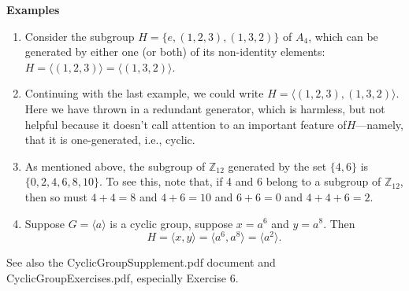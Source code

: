\documentclass[12pt]{article}
\newcommand{\Z} {{\mathbb Z}}
\newcommand{\<}{\ensuremath{\langle}}
\renewcommand{\>}{\ensuremath{\rangle}}
\theoremstyle{plain}
\theoremstyle{definition}
\begin{document}
{\bf Examples}
\begin{enumerate}
\item 
Consider the subgroup $H = \{e, (1,2,3), (1,3,2)\}$ of $A_4$,
which can be generated by either one (or both)
of its non-identity elements:
$H = \<(1,2,3)\> = \<(1,3,2)\>$.

\item
Continuing with the last example, we could write $H = \<(1,2,3), (1,3,2)\>$.
Here we have thrown in a redundant generator, which is harmless, but not helpful
because it doesn't call attention to an important feature of$H$---namely, that it is
one-generated, i.e., cyclic.

\item As mentioned above, the subgroup of $\Z_{12}$ generated by the set $\{4, 6\}$ is 
$\{0, 2, 4, 6, 8, 10\}$.
To see this, note that, if 4 and 6 belong to a
subgroup of $\Z_{12}$, then so must $4+4=8$ and $4+6=10$ and $6+6=0$ and
$4+4+6=2$.

\item 
Suppose $G = \<a\>$ is a cyclic group, suppose $x = a^6$ and $y = a^8$.
Then 
\[
H = \<x, y\> = \<a^6, a^8\> = \<a^2\>.
\]

\end{enumerate}
See also the CyclicGroupSupplement.pdf document and CyclicGroupExercises.pdf,
especially Exercise 6.
\end{document}

